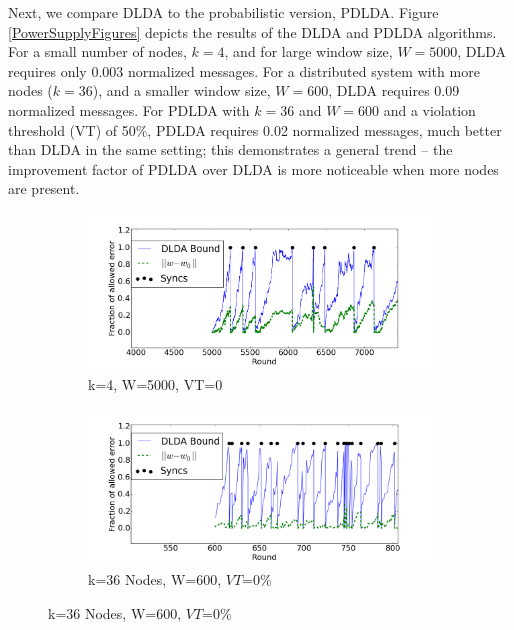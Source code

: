 Next, we compare DLDA to the probabilistic version, PDLDA. 
Figure \ref{PowerSupplyFigures} depicts the results of the DLDA
and PDLDA algorithms. For a small number of nodes, $k=4$, and for large
window size, $W=5000$, DLDA requires only 0.003 normalized messages.
For a distributed system with more nodes ($k=36$), and a smaller window
size, $W=600$, DLDA requires 0.09 normalized messages. For PDLDA with
$k=36$ and $W=600$ and a violation threshold (VT) of 50\%, PDLDA
requires 0.02 normalized messages, much better than DLDA in the same setting;
this demonstrates a general trend -- the improvement factor of PDLDA
over DLDA is more noticeable when more nodes are present.


\begin{figure}
    \centering
    \begin{subfigure}[b]{0.5\textwidth}
        \includegraphics[width=\textwidth]{graphics/4nodes.png}
        \caption{k=4, W=5000, VT=0}
    \end{subfigure}

    \begin{subfigure}[b]{0.5\textwidth}
        \includegraphics[width=\textwidth]{graphics/36nodes.png}
        \caption{k=36 Nodes, W=600, $VT$=0\%}
    \end{subfigure}


\end{figure}
